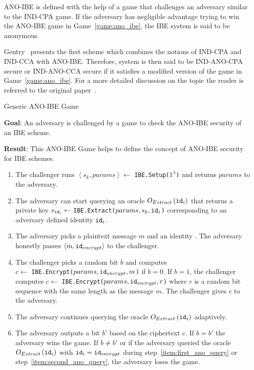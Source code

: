 ANO-IBE is defined with the help of a game that challenges an adversary similar to the IND-CPA game. If the adversary has negligible advantage trying to win the ANO-IBE game in Game~\ref{game:ano_ibe}, the IBE system is said to be anonymous.

Gentry~\cite{art:Gentry06} presents the first scheme which combines the notions of IND-CPA and IND-CCA with ANO-IBE. Therefore, system is then said to be IND-ANO-CPA secure or IND-ANO-CCA secure if it satisfies a modified version of the game in Game~\ref{game:ano_ibe}. For a more detailed discussion on the topic the reader is referred to the original paper~\cite{art:Gentry06}.

\begin{game}
\caption{Generic ANO-IBE Game~\cite{thesis:Alfredo08}}
\label{game:ano_ibe}
\begin{description}
 \item \textbf{Goal}: An adversary is challenged by a game to check the ANO-IBE security of an IBE scheme.
 
 \item \textbf{Result}: This ANO-IBE Game helps to define the concept of ANO-IBE security for IBE schemes.
\end{description}
 \begin{enumerate}
  \item The challenger runs $\left< s_k, params\right> \leftarrow$ \texttt{IBE.Setup($1^{\lambda}$)} and returns $params$ to the adversary.
  \item \label{item:first_ano_query} The adversary can start querying an oracle $O_{Extract} \left( \mathtt{id}_{i} \right)$ that returns a private key $s_{\mathtt{id}_{i}} \leftarrow$ \texttt{IBE.Extract($params, s_k, \mathtt{id}_{i}$)} corresponding to an adversary defined identity $\mathtt{id}_{i}$.
  \item The adversary picks a plaintext message $m$ and an identity . The adversary honestly passes $\left< m, \mathtt{id}_{encrypt} \right>$ to the challenger.
  \item The challenger picks a random bit $b$ and computes \\ $c \leftarrow$ \texttt{IBE.Encrypt($params, \mathtt{id}_{encrypt}, m$)} if $b=0$. If $b=1$, the challenger computes $c \leftarrow$ \texttt{IBE.Encrypt($params, \mathtt{id}_{encrypt}, r$)} where $r$ is a random bit sequence with the same length as the message $m$. The challenger gives $c$ to the adversary.
  \item \label{item:second_ano_query} The adversary continues querying the oracle $O_{Extract} \left( \mathtt{id}_{i} \right)$ adaptively.
  \item The adversary outputs a bit $b'$ based on the ciphertext $c$. If $b = b'$ the adversary wins the game. If $b \neq b'$ or if the adversary queried the oracle $O_{Extract} \left( \mathtt{id}_{i} \right)$ with $\mathtt{id}_{i} = \mathtt{id}_{encrypt}$ during step~\ref{item:first_ano_query} or step~\ref{item:second_ano_query}, the adversary loses the game.
 \end{enumerate}
\end{game}

